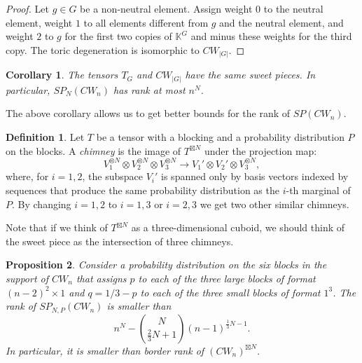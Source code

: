 \documentclass[a4paper,11pt,reqno]{amsart}
\newcommand{\bbK}{\mathbb{K}}
\numberwithin{equation}{section}
\theoremstyle{definition}
\newtheorem{defn}[equation]{Definition}
\theoremstyle{plain}
\newtheorem{prop}[defn]{Proposition}
\newtheorem{cor}[defn]{Corollary}
\theoremstyle{remark}
\begin{document}
\begin{proof}
Let $g\in G$ be a non-neutral element. Assign weight $0$ to the neutral element, weight $1$ to all elements different from $g$ and the neutral element, and weight $2$ to $g$ for the first two copies of $\bbK^G$ and minus these weights for the third copy. The toric degeneration is isomorphic to $CW_{|G|}$.
\end{proof}
\begin{cor}\label{cor:sweetCW=G}
The tensors $T_G$ and $CW_{|G|}$ have the same sweet pieces. In particular, $SP_N(CW_n)$ has \emph{rank} at most $n^N$.
\end{cor}
The above corollary allows us to get better bounds for the rank of $SP(CW_n)$.
\begin{defn}
Let $T$ be a tensor with a blocking and a probability distribution $P$ on the blocks. A \emph{chimney} is the image of $T^{\boxtimes N}$ under the projection map: \[V_1^{\otimes N}\otimes V_2^{\otimes N}\otimes V_3^{\otimes N}\rightarrow V_1'\otimes V_2'\otimes V_3^{\otimes N},\] where, for $i=1,2$, the subspace $V_i'$ is spanned only by basis vectors indexed by sequences that produce the same probability distribution as the $i$-th marginal of $P$.
By changing $i=1,2$ to $i=1,3$ or $i=2,3$ we get two other similar chimneys.
\end{defn}
Note that if we think of $T^{\boxtimes N}$ as a three-dimensional cuboid, we should think of the sweet piece as the intersection of three chimneys.
\begin{prop}\label{prop:sweetRank}
Consider a probability distribution on the six blocks in the support of $CW_n$ that assigns $p$ to each of the three large blocks of format $(n-2)^2\times 1$ and $q=1/3-p$ to each of the three small blocks of format $1^3$.
The rank of $SP_{N,P}(CW_n)$ is smaller than \[n^N-\binom{N}{\frac{2}{3}N+1}(n-1)^{\frac{1}{3}N-1}.\] In particular, it is smaller than border rank of $(CW_n)^{\boxtimes N}$.
\end{prop}
\end{document}
